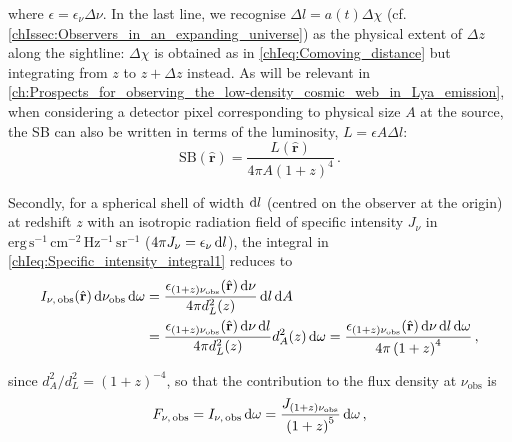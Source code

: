 \noindent where $\epsilon = \epsilon_\nu \Delta \nu$. In the last line, we recognise $\Delta l = a(t) \Delta \chi$ (cf. \cref{chIssec:Observers_in_an_expanding_universe}) as the physical extent of $\Delta z$ along the sightline: $\Delta \chi$ is obtained as in \cref{chIeq:Comoving_distance} but integrating from $z$ to $z + \Delta z$ instead. As will be relevant in \cref{ch:Prospects_for_observing_the_low-density_cosmic_web_in_Lya_emission}, when considering a detector pixel corresponding to physical size $A$ at the source, the SB can also be written in terms of the luminosity, $L = \epsilon A \Delta l$:
\begin{equation}
    \label{chIeq:Surface_brightness2}
    \text{SB} (\hat{\mathbf{r}}) = \frac{L (\hat{\mathbf{r}})}{4 \pi A \left( 1 + z \right)^4} \, .
\end{equation}

Secondly, for a spherical shell of width $\dif l$ (centred on the observer at the origin) at redshift $z$ with an isotropic radiation field of specific intensity $J_\nu$ in $\mathrm{erg \, s^{-1} \, cm^{-2} \, Hz^{-1} \, sr^{-1}}$ ($4 \pi J_\nu = \epsilon_\nu \dif l$), the integral in \cref{chIeq:Specific_intensity_integral1} reduces to
\begin{align}
    \label{chIeq:Specific_intensity_integral3}
    I_{\nu, \, \text{obs}} (\hat{\mathbf{r}}) \dif \nu_\text{obs} \dif \omega & = \frac{\epsilon_{(1 + z) \nu_\text{obs}} (\hat{\mathbf{r}}) \dif \nu}{4 \pi d_L^2(z)} \dif l \dif A \nonumber
    \\
    & = \frac{\epsilon_{(1 + z) \nu_\text{obs}} (\hat{\mathbf{r}}) \dif \nu \dif l}{4 \pi d_L^2(z)} d_A^2(z) \dif \omega = \frac{\epsilon_{(1 + z) \nu_\text{obs}} (\hat{\mathbf{r}}) \dif \nu \dif l \dif \omega}{4 \pi \left( 1 + z \right)^4} \, ,
\end{align}

\noindent since $d_A^2/d_L^2 = (1+z)^{-4}$, so that the contribution to the flux density at $\nu_\text{obs}$ is
\begin{equation}
    \label{chIeq:Flux_density1}
    F_{\nu, \, \text{obs}} = I_{\nu, \, \text{obs}} \dif \omega = \frac{J_{(1 + z) \nu_\text{obs}}}{\left( 1 + z \right)^5} \dif \omega \, ,
\end{equation}

